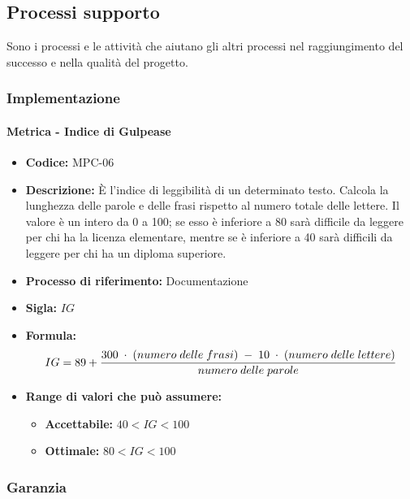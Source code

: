 \subsection{Processi supporto}
Sono i processi e le attività che aiutano gli altri processi nel raggiungimento del successo e nella qualità del progetto.
  
\subsubsection{Implementazione}
    \paragraph{Metrica - Indice di Gulpease}
    \begin{itemize}
        \item \textbf{Codice:} MPC-06
        \item \textbf{Descrizione:} È l'indice di leggibilità di un determinato testo. Calcola la lunghezza delle parole e delle frasi rispetto al numero totale delle lettere. Il valore è un intero da 0 a 100; se esso è inferiore a 80 sarà difficile da leggere per chi ha la licenza elementare, mentre se è inferiore a 40 sarà difficili da leggere per chi ha un diploma superiore.
        \item \textbf{Processo di riferimento:} Documentazione
        \item \textbf{Sigla:} $IG$
        \item \textbf{Formula:} $$IG = 89 + {{300 \; \cdot \; (numero\; delle \; frasi) \; - \; 10 \; \cdot \; (numero \; delle \; lettere)}\over numero \; delle \; parole}$$
        \item \textbf{Range di valori che può assumere:}
        \begin{itemize}
            \item \textbf{Accettabile:} $40 < IG < 100$
            \item \textbf{Ottimale:} $80 < IG < 100$
        \end{itemize}
    \end{itemize}

\subsubsection{Garanzia}
